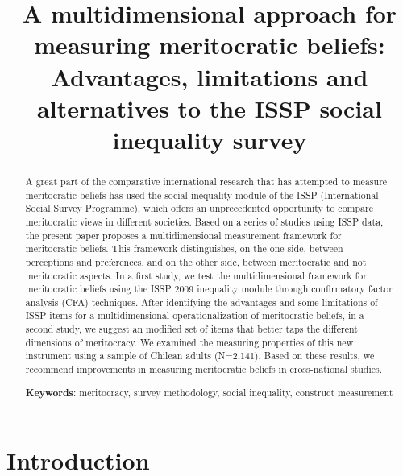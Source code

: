 \documentclass[
  10pt,
  a4paper,
]{article}
\title{A multidimensional approach for measuring meritocratic beliefs: Advantages, limitations and alternatives to the ISSP social inequality survey}
\author{}
\date{\vspace{-2.5em}}
\begin{document}
\maketitle
\begin{abstract}
A great part of the comparative international research that has attempted to measure meritocratic beliefs has used the social inequality module of the ISSP (International Social Survey Programme), which offers an unprecedented opportunity to compare meritocratic views in different societies. Based on a series of studies using ISSP data, the present paper proposes a multidimensional measurement framework for meritocratic beliefs. This framework distinguishes, on the one side, between perceptions and preferences, and on the other side, between meritocratic and not meritocratic aspects. In a first study, we test the multidimensional framework for meritocratic beliefs using the ISSP 2009 inequality module through confirmatory factor analysis (CFA) techniques. After identifying the advantages and some limitations of ISSP items for a multidimensional operationalization of meritocratic beliefs, in a second study, we suggest an modified set of items that better taps the different dimensions of meritocracy. We examined the measuring properties of this new instrument using a sample of Chilean adults (N=2,141). Based on these results, we recommend improvements in measuring meritocratic beliefs in cross-national studies.
\newline
\newline

\textbf{Keywords}: meritocracy, survey methodology, social inequality, construct measurement
\end{abstract}

\section{Introduction}\label{introduction}
\end{document}
